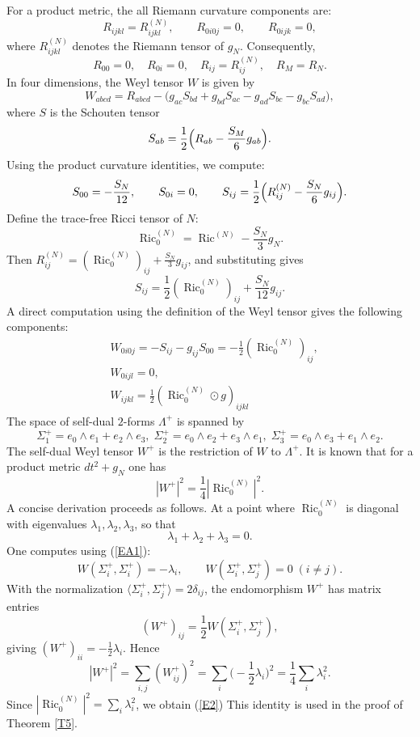\documentclass[12pt, twoside]{article}
\theoremstyle{definition}
\numberwithin{equation}{section}
\begin{document}
For a product metric, the all Riemann curvature components are:
\[
R_{ijkl} = R_{ijkl}^{(N)}, \qquad R_{0i0j} =0,\qquad R_{0ijk}=0,
\]
where $R_{ijkl}^{(N)}$ denotes the Riemann tensor of $g_N$. Consequently,
\[
R_{00} = 0,\quad R_{0i}=0,\quad R_{ij}=R_{ij}^{(N)},\quad R_M = R_N.
\]
In four dimensions, the Weyl tensor $W$ is given by
\[
W_{abcd} = R_{abcd} - \bigl(g_{ac}S_{bd}+g_{bd}S_{ac}-g_{ad}S_{bc}-g_{bc}S_{ad}\bigr),
\]
where $S$ is the Schouten tensor
\[
S_{ab} = \frac{1}{2}\Bigl(R_{ab} - \frac{S_M}{6}g_{ab}\Bigr).
\]
Using the product curvature identities, we compute:
\[
S_{00} = -\frac{S_N}{12},\qquad S_{0i}=0,\qquad S_{ij} = \frac12\Bigl(R_{ij}^{(N)}-\frac{S_N}{6}g_{ij}\Bigr).
\]
Define the trace-free Ricci tensor of $N$:
\[
\operatorname{Ric}_0^{(N)} = \operatorname{Ric}^{(N)} - \frac{S_N}{3}g_N.
\]
Then $R_{ij}^{(N)} = (\operatorname{Ric}_0^{(N)})_{ij} + \frac{S_N}{3}g_{ij}$, and substituting gives
\[
S_{ij} = \frac12 (\operatorname{Ric}_0^{(N)})_{ij} + \frac{S_N}{12}g_{ij}.
\]
A direct computation using the definition of the Weyl tensor gives the following components:
\begin{equation}\label{EA1}
\begin{split}
&W_{0i0j} = -S_{ij} - g_{ij}S_{00} = -\frac12 (\operatorname{Ric}_0^{(N)})_{ij},\\
&W_{0ijl} = 0,\\
&W_{ijkl}=\frac{1}{2}(\operatorname{Ric}_0^{(N)}\odot g)_{ijkl}
\end{split}
\end{equation}
The space of self-dual $2$-forms $\Lambda^+$ is spanned by
\[
\Sigma_1^+ = e_0\wedge e_1 + e_2\wedge e_3,\;
\Sigma_2^+ = e_0\wedge e_2 + e_3\wedge e_1,\;
\Sigma_3^+ = e_0\wedge e_3 + e_1\wedge e_2.
\]
The self-dual Weyl tensor $W^+$ is the restriction of $W$ to $\Lambda^+$. It is known that for a product metric $dt^2 + g_N$ one has
\begin{equation}\label{EA2}
|W^+|^2 = \frac{1}{4} |\operatorname{Ric}_0^{(N)}|^2.
\end{equation}
A concise derivation proceeds as follows. At a point where $\operatorname{Ric}_0^{(N)}$ is diagonal with eigenvalues $\lambda_1,\lambda_2,\lambda_3$, so  that 
$$\lambda_1+\lambda_2+\lambda_3=0.$$ 
One computes using (\ref{EA1}):
\[
W(\Sigma_i^+, \Sigma_i^+) =-\lambda_i,\qquad W(\Sigma_i^+, \Sigma_j^+) = 0\;(i\neq j).
\]
With the normalization  $\langle \Sigma_i^+,\Sigma_j^+\rangle = 2\delta_{ij}$, the endomorphism $W^+$ has matrix entries
$$(W^+)_{ij} = \frac{1}{2} W(\Sigma_i^+,\Sigma_j^+),$$
giving $(W^+)_{ii} = -\frac{1}{2}\lambda_i$. Hence
\[
|W^+|^2 = \sum_{i,j} (W^+_{ij})^2 = \sum_i \bigl(-\frac{1}{2}\lambda_i\bigr)^2 = \frac{1}{4}\sum_i \lambda_i^2.
\]
Since $|\operatorname{Ric}_0^{(N)}|^2 = \sum_i \lambda_i^2$, we obtain (\ref{E2})
This identity is used in the proof of Theorem \ref{T5}.
\end{document}
